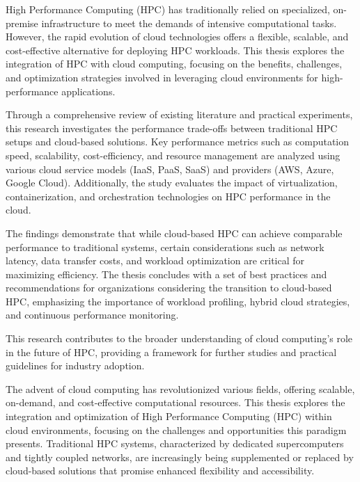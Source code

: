 %
%

High Performance Computing (HPC) has traditionally relied on specialized, on-premise infrastructure to meet the demands of intensive computational tasks. However, the rapid evolution of cloud technologies offers a flexible, scalable, and cost-effective alternative for deploying HPC workloads. This thesis explores the integration of HPC with cloud computing, focusing on the benefits, challenges, and optimization strategies involved in leveraging cloud environments for high-performance applications. 

Through a comprehensive review of existing literature and practical experiments, this research investigates the performance trade-offs between traditional HPC setups and cloud-based solutions. Key performance metrics such as computation speed, scalability, cost-efficiency, and resource management are analyzed using various cloud service models (IaaS, PaaS, SaaS) and providers (AWS, Azure, Google Cloud). Additionally, the study evaluates the impact of virtualization, containerization, and orchestration technologies on HPC performance in the cloud.

The findings demonstrate that while cloud-based HPC can achieve comparable performance to traditional systems, certain considerations such as network latency, data transfer costs, and workload optimization are critical for maximizing efficiency. The thesis concludes with a set of best practices and recommendations for organizations considering the transition to cloud-based HPC, emphasizing the importance of workload profiling, hybrid cloud strategies, and continuous performance monitoring.

This research contributes to the broader understanding of cloud computing's role in the future of HPC, providing a framework for further studies and practical guidelines for industry adoption.

The advent of cloud computing has revolutionized various fields, offering scalable, on-demand, and cost-effective computational resources. This thesis explores the integration and optimization of High Performance Computing (HPC) within cloud environments, focusing on the challenges and opportunities this paradigm presents. Traditional HPC systems, characterized by dedicated supercomputers and tightly coupled networks, are increasingly being supplemented or replaced by cloud-based solutions that promise enhanced flexibility and accessibility.

